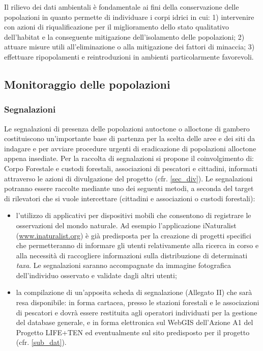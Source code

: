 \documentclass[11pt,a4paper,italian,twoside,openany]{memoir}
\begin{document}
Il rilievo dei dati ambientali è fondamentale ai fini della conservazione delle popolazioni in quanto permette di individuare i corpi idrici in cui: 1) intervenire con azioni di riqualificazione per il miglioramento dello stato qualitativo dell'habitat e la conseguente mitigazione dell'isolamento delle popolazioni; 2) attuare misure utili all'eliminazione o alla mitigazione dei fattori di minaccia; 3) effettuare ripopolamenti e reintroduzioni in ambienti particolarmente favorevoli.

\subsection{Monitoraggio delle popolazioni}
\subsubsection{Segnalazioni}
\label{subsub_segn}
Le segnalazioni di presenza delle popolazioni autoctone o alloctone di gambero costituiscono un'importante base di partenza per la scelta delle aree e dei siti da indagare e per avviare procedure urgenti di eradicazione di popolazioni alloctone appena insediate. Per la raccolta di segnalazioni si propone il coinvolgimento di: Corpo Forestale e custodi forestali, associazioni di pescatori e cittadini, informati attraverso le azioni di divulgazione del progetto (cfr. \ref{sec_div}).
Le segnalazioni potranno essere raccolte mediante uno dei seguenti metodi, a seconda del target di rilevatori che si vuole intercettare (cittadini e associazioni o custodi forestali):
\begin{itemize}
  \item l'utilizzo di applicativi per dispositivi mobili che consentono di registrare le osservazioni del mondo naturale. Ad esempio l'applicazione iNaturalist (\url{www.inaturalist.org}) è già predisposta per la creazione di progetti specifici che permetteranno di informare gli utenti relativamente alla ricerca in corso e alla necessità di raccogliere informazioni sulla distribuzione di determinati \emph{taxa}. Le segnalazioni saranno accompagnate da immagine fotografica dell'individuo osservato e validate dagli altri utenti; 
  \item la compilazione di un'apposita scheda di segnalazione (Allegato II) che sarà resa disponibile: in forma cartacea, presso le stazioni forestali e le associazioni di pescatori e dovrà essere restituita agli operatori individuati per la gestione del database generale, e in forma elettronica sul WebGIS dell'Azione A1 del Progetto LIFE+TEN ed eventualmente sul sito predisposto per il progetto (cfr. \ref{sub_dat}).
\end{itemize}
\end{document}
